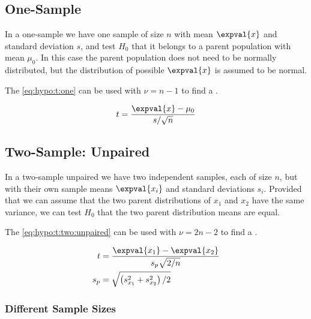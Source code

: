 \subsection{One-Sample}
\label{hypo:t_test:one}

In a one-sample \ttest we have one sample of size $n$ with mean $\expval{x}$ and standard deviation $s$,
and test $H_{0}$ that it belongs to a parent population with mean $\mu_{0}$.
In this case the parent population does not need to be normally distributed, but the distribution of possible $\expval{x}$ is assumed to be normal.

The \tstat \cref{eq:hypo:t:one} can be used with $\nu = n-1$ to find a \pvalue.

\begin{equation}\label{eq:hypo:t:one}
t = \frac{\expval{x} - \mu_{0}}{s / \sqrt{n}}
\end{equation}

\subsection{Two-Sample: Unpaired}
\label{hypo:t_test:two:unpaired}

In a two-sample unpaired \ttest we have two independent samples, each of size $n$,
but with their own sample means $\expval{x_{i}}$ and standard deviations $s_{i}$.
Provided that we can assume that the two parent distributions of $x_{1}$ and $x_{2}$ have the same variance,
we can test $H_{0}$ that the two parent distribution means are equal.

The \tstat \cref{eq:hypo:t:two:unpaired} can be used with $\nu = 2n-2$ to find a \pvalue.

\begin{subequations}\label{eq:hypo:t:two:unpaired}
\begin{align}
t &= \frac{\expval{x_{1}} - \expval{x_{2}}}{s_{p} \sqrt{2/n}} \label{eq:hypo:t:two:unpaired:t} \\
s_{p} &= \sqrt{\left(s^{2}_{x_{1}} + s^{2}_{x_{2}}\right)/2} \label{eq:hypo:t:two:unpaired:s_p}
\end{align}
\end{subequations}

\subsubsection{Different Sample Sizes}
\label{hypo:t_test:two:unpaired:diff_n}

